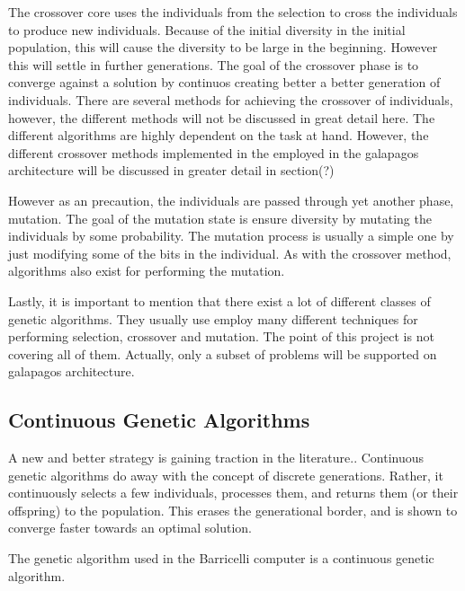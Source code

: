 The crossover core uses the individuals from the selection to cross the individuals to produce new individuals. Because of the initial diversity in the initial population, this will cause the diversity to be large in the beginning. However this will settle in further generations. The goal of the crossover phase is to converge against a solution by continuos creating better a better generation of individuals. There are several methods for achieving the crossover of individuals, however, the different methods will not be discussed in great detail here. The different algorithms are highly dependent on the task at hand. However, the different crossover methods implemented in the employed in the galapagos architecture will be discussed in greater detail in section(?) 

However as an precaution, the individuals are passed through yet another phase, mutation. The goal of the mutation state is ensure diversity by mutating the individuals by some probability. The mutation process is usually a simple one by just modifying some of the bits in the individual. As with the crossover method, algorithms also exist for performing the mutation. 

Lastly, it is important to mention that there exist a lot of different classes of genetic algorithms. They usually use employ many different techniques for performing selection, crossover and mutation. The point of this project is not covering all of them. Actually, only a subset of problems will be supported on galapagos architecture. 








\subsection{Continuous Genetic Algorithms}

A new and better strategy is gaining traction in the literature..
Continuous genetic algorithms do away with the concept of discrete generations.
Rather, it continuously selects a few individuals, processes them, and returns them (or their offspring) to the population.
This erases the generational border, and is shown  to converge faster towards an optimal solution.

The genetic algorithm used in the Barricelli computer is a continuous genetic algorithm.


